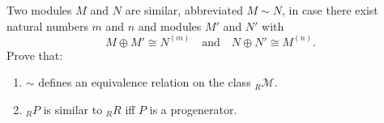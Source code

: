 Two modules $M$ and $N$ are similar, abbreviated $M \sim N$, in case there exist natural numbers $m$ and $n$ and modules $M'$ and $N'$ with
$$M \oplus M' \cong N^{(m)} \quad \text{and} \quad N \oplus N' \cong M^{(n)}.$$
Prove that:
\begin{enumerate}
    \item[(1)] $\sim$ defines an equivalence relation on the class ${}_R \mathcal{M}$.
    \item[(2)] ${}_R P$ is similar to ${}_R R$ iff $P$ is a progenerator.
\end{enumerate}
